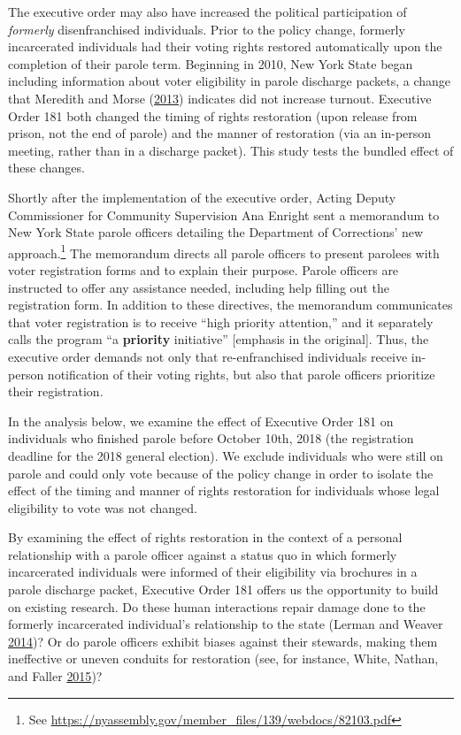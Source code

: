 \documentclass[
  12pt,
]{article}
\begin{document}
The executive order may also have increased the political participation of \emph{formerly} disenfranchised individuals. Prior to the policy change, formerly incarcerated individuals had their voting rights restored automatically upon the completion of their parole term. Beginning in 2010, New York State began including information about voter eligibility in parole discharge packets, a change that Meredith and Morse (\protect\hyperlink{ref-Meredith2013}{2013}) indicates did not increase turnout. Executive Order 181 both changed the timing of rights restoration (upon release from prison, not the end of parole) and the manner of restoration (via an in-person meeting, rather than in a discharge packet). This study tests the bundled effect of these changes.

Shortly after the implementation of the executive order, Acting Deputy Commissioner for Community Supervision Ana Enright sent a memorandum to New York State parole officers detailing the Department of Corrections' new approach.\footnote{See \url{https://nyassembly.gov/member_files/139/webdocs/82103.pdf}} The memorandum directs all parole officers to present parolees with voter registration forms and to explain their purpose. Parole officers are instructed to offer any assistance needed, including help filling out the registration form. In addition to these directives, the memorandum communicates that voter registration is to receive ``high priority attention,'' and it separately calls the program ``a \textbf{priority} initiative'' {[}emphasis in the original{]}. Thus, the executive order demands not only that re-enfranchised individuals receive in-person notification of their voting rights, but also that parole officers prioritize their registration.

In the analysis below, we examine the effect of Executive Order 181 on individuals who finished parole before October 10th, 2018 (the registration deadline for the 2018 general election). We exclude individuals who were still on parole and could only vote because of the policy change in order to isolate the effect of the timing and manner of rights restoration for individuals whose legal eligibility to vote was not changed.

By examining the effect of rights restoration in the context of a personal relationship with a parole officer against a status quo in which formerly incarcerated individuals were informed of their eligibility via brochures in a parole discharge packet, Executive Order 181 offers us the opportunity to build on existing research. Do these human interactions repair damage done to the formerly incarcerated individual's relationship to the state (Lerman and Weaver \protect\hyperlink{ref-Lerman2014}{2014})? Or do parole officers exhibit biases against their stewards, making them ineffective or uneven conduits for restoration (see, for instance, White, Nathan, and Faller \protect\hyperlink{ref-White2015}{2015})?
\end{document}
